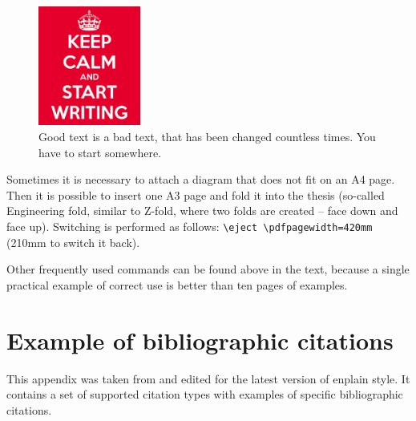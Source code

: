 \begin{figure}[hbt]
	\centering
	\includegraphics[width=0.3\textwidth]{obrazky-figures/keep-calm.png}
	\caption{Good text is a bad text, that has been changed countless times. You have to start somewhere.}
	\label{keepCalm}
\end{figure}

Sometimes it is necessary to attach a diagram that does not fit on an A4 page. Then it is possible to insert one A3 page and fold it into the thesis (so-called Engineering fold, similar to Z-fold, where two folds are created -- face down and face up). Switching is performed as follows: \texttt{\textbackslash{}eject \textbackslash{}pdfpagewidth=420mm} (210mm to switch it back).

Other frequently used commands can be found above in the text, because a single practical example of correct use is better than ten pages of examples.



\newcommand{\zarazky}{%
Location in source document: \= %
Some horribly long example \= \kill}

\newcommand{\odradkovani}{\\[0.3em]}

\chapter{Example of bibliographic citations}
\label{priloha-priklady-citaci}
This appendix was taken from \cite{Pysny} and edited for the latest version of enplain style. It contains a set of supported citation types with examples of specific bibliographic citations.

